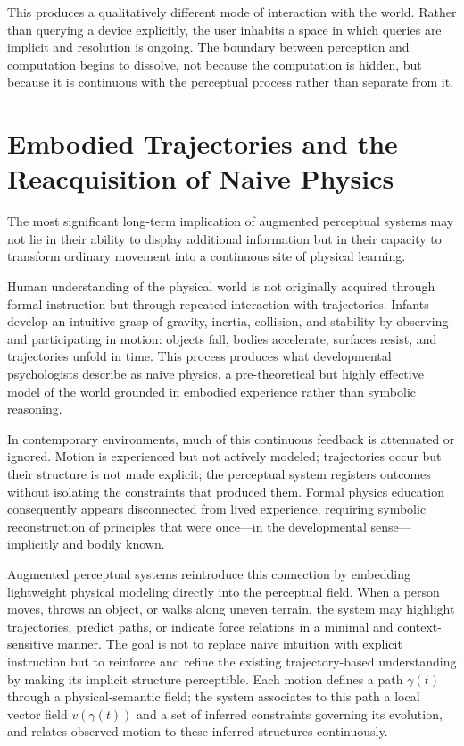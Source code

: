 \documentclass[12pt,a4paper,openany]{book}
\theoremstyle{plain}
\theoremstyle{definition}
\theoremstyle{remark}
\begin{document}
This produces a qualitatively different mode of interaction with the world. Rather than querying a device explicitly, the user inhabits a space in which queries are implicit and resolution is ongoing. The boundary between perception and computation begins to dissolve, not because the computation is hidden, but because it is continuous with the perceptual process rather than separate from it.

\section{Embodied Trajectories and the Reacquisition of Naive Physics}

The most significant long-term implication of augmented perceptual systems may not lie in their ability to display additional information but in their capacity to transform ordinary movement into a continuous site of physical learning.

Human understanding of the physical world is not originally acquired through formal instruction but through repeated interaction with trajectories. Infants develop an intuitive grasp of gravity, inertia, collision, and stability by observing and participating in motion: objects fall, bodies accelerate, surfaces resist, and trajectories unfold in time. This process produces what developmental psychologists describe as naive physics, a pre-theoretical but highly effective model of the world grounded in embodied experience rather than symbolic reasoning.

In contemporary environments, much of this continuous feedback is attenuated or ignored. Motion is experienced but not actively modeled; trajectories occur but their structure is not made explicit; the perceptual system registers outcomes without isolating the constraints that produced them. Formal physics education consequently appears disconnected from lived experience, requiring symbolic reconstruction of principles that were once---in the developmental sense---implicitly and bodily known.

Augmented perceptual systems reintroduce this connection by embedding lightweight physical modeling directly into the perceptual field. When a person moves, throws an object, or walks along uneven terrain, the system may highlight trajectories, predict paths, or indicate force relations in a minimal and context-sensitive manner. The goal is not to replace naive intuition with explicit instruction but to reinforce and refine the existing trajectory-based understanding by making its implicit structure perceptible. Each motion defines a path $\gamma(t)$ through a physical-semantic field; the system associates to this path a local vector field $v(\gamma(t))$ and a set of inferred constraints governing its evolution, and relates observed motion to these inferred structures continuously.
\end{document}
